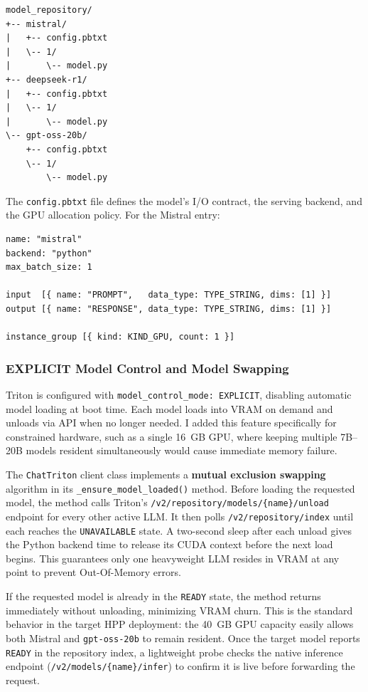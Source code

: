 \begin{verbatim}
model_repository/
+-- mistral/
|   +-- config.pbtxt
|   \-- 1/
|       \-- model.py
+-- deepseek-r1/
|   +-- config.pbtxt
|   \-- 1/
|       \-- model.py
\-- gpt-oss-20b/
    +-- config.pbtxt
    \-- 1/
        \-- model.py
\end{verbatim}

The \texttt{config.pbtxt} file defines the model's I/O contract, the serving backend, and the GPU allocation policy. For the Mistral entry:

\begin{verbatim}
name: "mistral"
backend: "python"
max_batch_size: 1

input  [{ name: "PROMPT",   data_type: TYPE_STRING, dims: [1] }]
output [{ name: "RESPONSE", data_type: TYPE_STRING, dims: [1] }]

instance_group [{ kind: KIND_GPU, count: 1 }]
\end{verbatim}

\subsubsection{EXPLICIT Model Control and Model Swapping}

Triton is configured with \texttt{model\_\allowbreak control\_\allowbreak mode: EXPLICIT}, disabling automatic model loading at boot time. Each model loads into VRAM on demand and unloads via API when no longer needed. I added this feature specifically for constrained hardware, such as a single 16~GB GPU, where keeping multiple 7B--20B models resident simultaneously would cause immediate memory failure.

The \texttt{ChatTriton} client class implements a \textbf{mutual exclusion swapping} algorithm in its \texttt{\_\allowbreak ensure\_\allowbreak model\_\allowbreak loaded()} method. Before loading the requested model, the method calls Triton's \texttt{/v2/repository/models/\{name\}/unload} endpoint for every other active LLM. It then polls \texttt{/v2/repository/index} until each reaches the \texttt{UNAVAILABLE} state. A two-second sleep after each unload gives the Python backend time to release its CUDA context before the next load begins. This guarantees only one heavyweight LLM resides in VRAM at any point to prevent Out-Of-Memory errors.

If the requested model is already in the \texttt{READY} state, the method returns immediately without unloading, minimizing VRAM churn. This is the standard behavior in the target HPP deployment: the 40~GB GPU capacity easily allows both Mistral and \texttt{gpt-oss-20b} to remain resident. Once the target model reports \texttt{READY} in the repository index, a lightweight probe checks the native inference endpoint (\texttt{/v2/models/\{name\}/infer}) to confirm it is live before forwarding the request.

